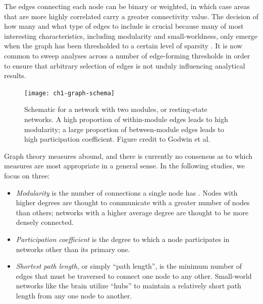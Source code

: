 The edges connecting each node can be binary or weighted, in which case areas that are more highly correlated carry a greater connectivity value. The decision of how many and what type of edges to include is crucial because many of most interesting characteristics, including modularity and small-worldness, only emerge when the graph has been thresholded to a certain level of sparsity \citep{Moussa2012}. It is now common to sweep analyses across a number of edge-forming thresholds in order to ensure that arbitrary selection of edges is not unduly influencing analytical results.

\begin{figure}[t]
    \centering
    \texttt{[image: ch1-graph-schema]}
    \caption[Schematic for a network with two modules.]{Schematic for a network with two modules, or resting-state networks. A high proportion of within-module edges leads to high modularity; a large proportion of between-module edges leads to high participation coefficient. Figure credit to Godwin et al. \citep{Godwin2016}}
    \label{fig:ch1-graph-schema}
\end{figure}

Graph theory measures abound, and there is currently no consensus as to which measures are most appropriate in a general sense. In the following studies, we focus on three: 

\begin{itemize}
    \item \textit{Modularity} is the number of connections a single node has \citep{Sporns2013}. Nodes with higher degrees are thought to communicate with a greater number of nodes than others; networks with a higher average degree are thought to be more densely connected.  
    \item \textit{Participation coefficient} is the degree to which a node participates in networks other than its primary one.
    \item \textit{Shortest path length}, or simply ``path length'', is the minimum number of edges that must be traversed to connect one node to any other. Small-world networks like the brain utilize ``hubs'' to maintain a relatively short path length from any one node to another. 
\end{itemize}


